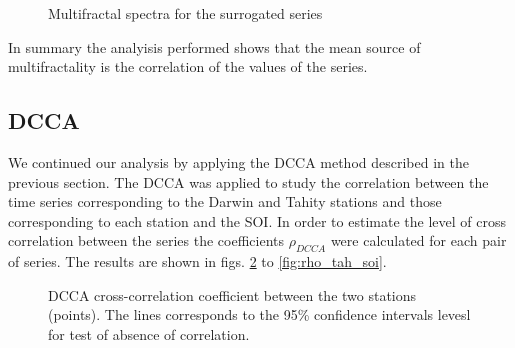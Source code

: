 \documentclass[onecolumn, preprint,aps,amsmath, amssymb, superscriptaddress]{revtex4}
\begin{document}
\begin{figure}
\caption{Multifractal spectra for the surrogated series}
\label{fig:h-hsurr}
\end{figure}


In summary the analyisis performed shows that the mean source of multifractality is the correlation of the values of the series.



\subsection{DCCA}
\label{results_dcca}

We continued our analysis by applying the DCCA method described in the previous section. The DCCA was applied to study the correlation between the time series corresponding to the Darwin and Tahity stations and those corresponding to  each station and the SOI. In order to estimate the level of cross correlation between the series the coefficients $\rho_{DCCA}$ were calculated for each pair of series. The results are shown in figs. \ref{fig:rho_stations} to \ref{fig:rho_tah_soi}.

\begin{figure}
\caption{DCCA cross-correlation coefficient between the two stations (points). The lines corresponds to the 95\% confidence intervals levesl for test of absence of correlation.}
\label{fig:rho_stations}
\end{figure}
\end{document}
